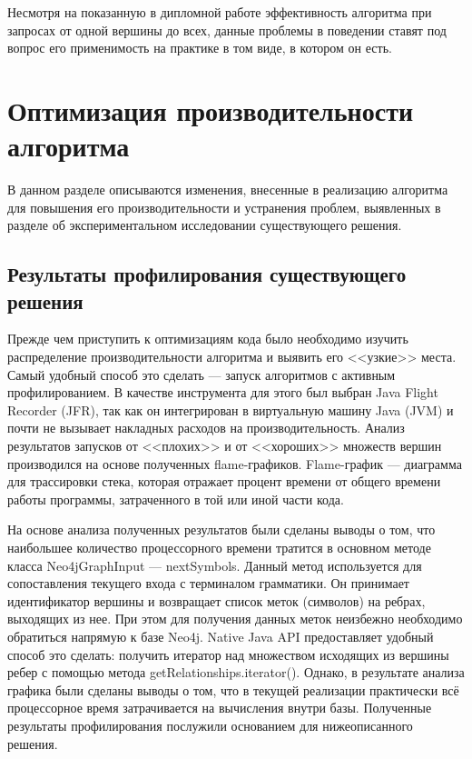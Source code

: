 \documentclass[14pt]{matmex-diploma-custom}
\theoremstyle{definition}
\begin{document}
Несмотря на показанную в дипломной работе эффективность алгоритма при запросах от одной вершины до всех, данные проблемы в поведении ставят под вопрос его применимость на практике в том виде, в котором он есть.


\section{Оптимизация производительности\\ алгоритма}
В данном разделе описываются изменения, внесенные в реализацию алгоритма для повышения его производительности и устранения проблем, выявленных в разделе об экспериментальном исследовании существующего решения.

\subsection{Результаты профилирования существующего\\ решения}

Прежде чем приступить к оптимизациям кода было необходимо изучить распределение производительности алгоритма и выявить его <<узкие>> места. Самый удобный способ это сделать --- запуск алгоритмов с активным профилированием. В качестве инструмента для этого был выбран Java Flight Recorder (JFR), так как он интегрирован в виртуальную машину Java (JVM) и почти не вызывает накладных расходов на производительность. Анализ результатов запусков от <<плохих>> и от <<хороших>> множеств вершин производился на основе полученных flame-графиков. Flame-график --- диаграмма для трассировки стека, которая отражает процент времени от общего времени работы программы, затраченного в той или иной части кода. 

На основе анализа полученных результатов были сделаны выводы о том, что наибольшее количество процессорного времени тратится в основном методе класса Neo4jGraphInput --- nextSymbols. Данный метод используется для сопоставления текущего входа с терминалом грамматики. Он принимает идентификатор вершины и возвращает список меток (символов) на ребрах, выходящих из нее. При этом для получения данных меток неизбежно необходимо обратиться напрямую к базе Neo4j. Native Java API предоставляет удобный способ это сделать: получить итератор над множеством исходящих из вершины ребер с помощью метода getRelationships.iterator(). Однако, в результате анализа графика были сделаны выводы о том, что в текущей реализации практически всё процессорное время затрачивается на вычисления внутри базы. Полученные результаты профилирования послужили основанием для нижеописанного решения.
\end{document}
